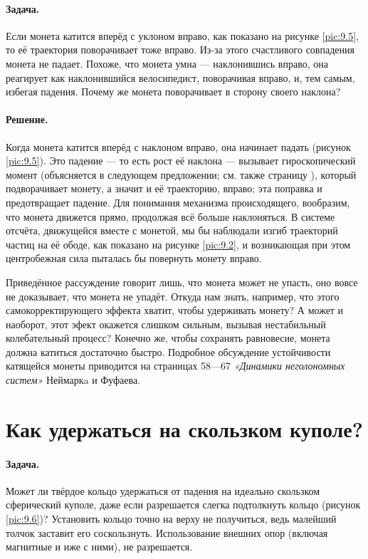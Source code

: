 \paragraph{Задача.}
Если монета катится вперёд с уклоном вправо, как показано на рисунке \ref{pic:9.5}, то её траектория поворачивает тоже вправо.
Из-за этого счастливого совпадения монета не падает.
Похоже, что монета умна --- наклонившись вправо, она реагирует как наклонившийся велосипедист, поворачивая вправо, и, тем самым, избегая падения.
Почему же монета поворачивает в сторону своего наклона?

\paragraph{Решение.}
Когда монета катится вперёд с наклоном вправо,
она начинает падать (рисунок \ref{pic:9.5}).
Это падение --- то есть рост её наклона ---
вызывает гироскопический момент (объясняется в следующем предложении;
см. также страницу \pageref{Антигравитационное велоколесо:Ответ}),
который подворачивает монету, а значит и её траекторию, вправо; эта поправка и предотвращает падение.
Для понимания механизма происходящего, вообразим, что монета движется прямо, продолжая всё больше наклоняться.
В системе отсчёта, движущейся вместе с монетой, мы бы наблюдали изгиб траекторий частиц на её ободе, как показано
на рисунке \ref{pic:9.2}, и возникающая при этом центробежная сила пыталась бы повернуть монету вправо.

Приведённое рассуждение говорит лишь, что монета может не упасть, оно вовсе не доказывает, что монета не упадёт.
Откуда нам знать, например, что этого самокорректирующего эффекта хватит, чтобы удерживать монету?
А может и наоборот, этот эфект окажется слишком сильным, вызывая нестабильный колебательный процесс?
Конечно же, чтобы сохранять равновесие, монета должна катиться достаточно быстро.
Подробное обсуждение устойчивости катящейся монеты приводится на страницах 58---67 \emph{«Динамики неголономных систем»} Неймаркa и Фуфаева.

\section{Как удержаться на скользком куполе?}\label{Как удержаться на скользком куполе?}

\paragraph{Задача.}
Может ли твёрдое кольцо удержаться от падения на идеально скользком сферический куполе, даже если разрешается слегка подтолкнуть кольцо (рисунок \ref{pic:9.6})?
Установить кольцо точно на верху не получиться, ведь малейший толчок заставит его соскользнуть.
Использование внешних опор (включая магнитные и иже с ними), не разрешается.

